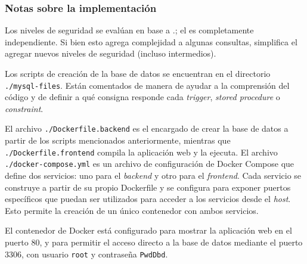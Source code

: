 \subsubsection{Notas sobre la implementación}

Los niveles de seguridad se evalúan en base a .; el 
 es completamente independiente. Si bien esto agrega complejidad
a algunas consultas, simplifica el agregar nuevos niveles de seguridad (incluso
intermedios).

Los scripts de creación de la base de datos se encuentran en el directorio 
\texttt{./mysql-files}. Están comentados de manera de ayudar a la comprensión
del código y de definir a qué consigna responde cada \textit{trigger}, 
\textit{stored procedure} o \textit{constraint}.

El archivo \texttt{./Dockerfile.backend} es el encargado de crear la base de 
datos a partir de los scripts mencionados anteriormente, mientras que 
\texttt{./Dockerfile.frontend} compila la aplicación web y la ejecuta.
El archivo \texttt{./docker-compose.yml} es un archivo de configuración de 
Docker Compose que define dos servicios: uno para el \textit{backend} y otro 
para el \textit{frontend}. Cada servicio se construye a partir de su propio 
Dockerfile y se configura para exponer puertos específicos que puedan ser 
utilizados para acceder a los servicios desde el \textit{host}. Esto permite la
creación de un único contenedor con ambos servicios.

El contenedor de Docker está configurado para mostrar la aplicación web en el 
puerto 80, y para permitir el acceso directo a la base de datos mediante el 
puerto 3306, con usuario \verb|root| y contraseña \verb|PwdDbd|.

